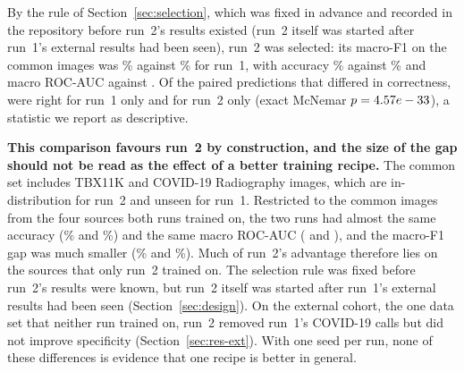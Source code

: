 
By the rule of Section~\ref{sec:selection}, which was fixed in advance and recorded in the repository before run~2's results existed (run~2 itself was started after run~1's external results had been seen), run~2 was selected: its macro-F1 on the \RCmpN{} common images was \RCmpRunTwoMacroFOne\% against \RCmpRunOneMacroFOne\% for run~1, with accuracy \RCmpRunTwoAcc\% against \RCmpRunOneAcc\% and macro ROC-AUC \RCmpRunTwoMacroAUC{} against \RCmpRunOneMacroAUC. Of the paired predictions that differed in correctness, \RCmpMcNemarB{} were right for run~1 only and \RCmpMcNemarC{} for run~2 only (exact McNemar $p=4.57e-33$), a statistic we report as descriptive.

\textbf{This comparison favours run~2 by construction, and the size of the gap should not be read as the effect of a better training recipe.} The common set includes TBX11K and COVID-19 Radiography images, which are in-distribution for run~2 and unseen for run~1. Restricted to the \RCmpRunOneSharedN{} common images from the four sources both runs trained on, the two runs had almost the same accuracy (\RCmpRunOneSharedAcc\% and \RCmpRunTwoSharedAcc\%) and the same macro ROC-AUC (\RCmpRunOneSharedMacroAUC{} and \RCmpRunTwoSharedMacroAUC), and the macro-F1 gap was much smaller (\RCmpRunOneSharedMacroFOne\% and \RCmpRunTwoSharedMacroFOne\%). Much of run~2's advantage therefore lies on the sources that only run~2 trained on. The selection rule was fixed before run~2's results were known, but run~2 itself was started after run~1's external results had been seen (Section~\ref{sec:design}). On the external cohort, the one data set that neither run trained on, run~2 removed run~1's COVID-19 calls but did not improve specificity (Section~\ref{sec:res-ext}). With one seed per run, none of these differences is evidence that one recipe is better in general.

